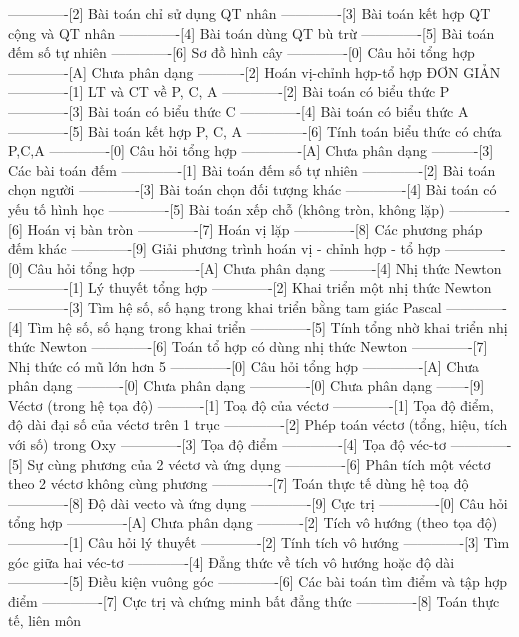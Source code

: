 -------------[2] Bài toán chỉ sử dụng QT nhân
-------------[3] Bài toán kết hợp QT cộng và QT nhân
-------------[4] Bài toán dùng QT bù trừ
-------------[5] Bài toán đếm số tự nhiên
-------------[6] Sơ đồ hình cây
-------------[0] Câu hỏi tổng hợp
-------------[A] Chưa phân dạng
----------[2] Hoán vị-chỉnh hợp-tổ hợp ĐƠN GIẢN
-------------[1] LT và CT về P, C, A
-------------[2] Bài toán có biểu thức P
-------------[3] Bài toán có biểu thức C
-------------[4] Bài toán có biểu thức A
-------------[5] Bài toán kết hợp P, C, A
-------------[6] Tính toán biểu thức có chứa P,C,A
-------------[0] Câu hỏi tổng hợp
-------------[A] Chưa phân dạng
----------[3] Các bài toán đếm 
-------------[1] Bài toán đếm số tự nhiên
-------------[2] Bài toán chọn người
-------------[3] Bài toán chọn đối tượng khác
-------------[4] Bài toán có yếu tố hình học
-------------[5] Bài toán xếp chỗ (không tròn, không lặp)
-------------[6] Hoán vị bàn tròn
-------------[7] Hoán vị lặp
-------------[8] Các phương pháp đếm khác
-------------[9] Giải phương trình hoán vị - chỉnh hợp -  tổ hợp
-------------[0] Câu hỏi tổng hợp
-------------[A] Chưa phân dạng
----------[4] Nhị thức Newton
-------------[1] Lý thuyết tổng hợp 
-------------[2] Khai triển một nhị thức Newton
-------------[3] Tìm hệ số, số hạng trong khai triển bằng tam giác Pascal
-------------[4] Tìm hệ số, số hạng trong khai triển
-------------[5] Tính tổng nhờ khai triển nhị thức Newton
-------------[6] Toán tổ hợp có dùng nhị thức Newton
-------------[7] Nhị thức có mũ lớn hơn 5
-------------[0] Câu hỏi tổng hợp
-------------[A] Chưa phân dạng
----------[0] Chưa phân dạng
-------------[0] Chưa phân dạng
-------[9] Véctơ (trong hệ tọa độ)
----------[1] Toạ độ của véctơ
-------------[1] Tọa độ điểm, độ dài đại số của véctơ trên 1 trục
-------------[2] Phép toán véctơ (tổng, hiệu, tích với số) trong Oxy
-------------[3] Tọa độ điểm 
-------------[4] Tọa độ véc-tơ
-------------[5] Sự cùng phương của 2 véctơ và ứng dụng
-------------[6] Phân tích một véctơ theo 2 véctơ không cùng phương
-------------[7] Toán thực tế dùng hệ toạ độ
-------------[8] Độ dài vecto và ứng dụng
-------------[9] Cực trị
-------------[0] Câu hỏi tổng hợp
-------------[A] Chưa phân dạng
----------[2] Tích vô hướng (theo tọa độ)
-------------[1] Câu hỏi lý thuyết
-------------[2] Tính tích vô hướng
-------------[3] Tìm góc giữa hai véc-tơ
-------------[4] Đẳng thức về tích vô hướng hoặc độ dài
-------------[5] Điều kiện vuông góc
-------------[6] Các bài toán tìm điểm và tập hợp điểm
-------------[7] Cực trị và chứng minh bất đẳng thức
-------------[8] Toán thực tế, liên môn
